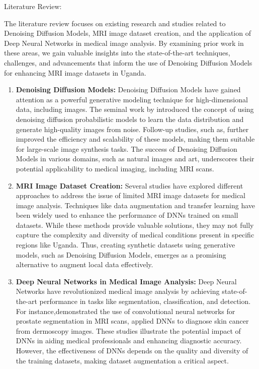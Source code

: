Literature Review:

The literature review focuses on existing research and studies related to Denoising Diffusion Models, MRI image dataset creation, and the application of Deep Neural Networks in medical image analysis. By examining prior work in these areas, we gain valuable insights into the state-of-the-art techniques, challenges, and advancements that inform the use of Denoising Diffusion Models for enhancing MRI image datasets in Uganda.

\begin{enumerate}

    \item {\bf Denoising Diffusion Models:}
    Denoising Diffusion Models have gained attention as a powerful generative modeling technique for high-dimensional data, including images. The seminal work by\cite{ho2020denoising} introduced the concept of using denoising diffusion probabilistic models to learn the data distribution and generate high-quality images from noise. Follow-up studies, such as\cite{dhariwal2021diffusion}, further improved the efficiency and scalability of these models, making them suitable for large-scale image synthesis tasks. The success of Denoising Diffusion Models in various domains, such as natural images and art, underscores their potential applicability to medical imaging, including MRI scans.

    \item {\bf MRI Image Dataset Creation:}
    Several studies have explored different approaches to address the issue of limited MRI image datasets for medical image analysis. Techniques like data augmentation and transfer learning\cite{sanford2020data} have been widely used to enhance the performance of DNNs trained on small datasets. While these methods provide valuable solutions, they may not fully capture the complexity and diversity of medical conditions present in specific regions like Uganda. Thus, creating synthetic datasets using generative models, such as Denoising Diffusion Models, emerges as a promising alternative to augment local data effectively.

    \item {\bf Deep Neural Networks in Medical Image Analysis:}
    Deep Neural Networks have revolutionized medical image analysis by achieving state-of-the-art performance in tasks like segmentation, classification, and detection. For instance,\cite{bejnordi2017context}demonstrated the use of convolutional neural networks for prostate segmentation in MRI scans,\cite{ali2021enhanced} applied DNNs to diagnose skin cancer from dermoscopy images. These studies illustrate the potential impact of DNNs in aiding medical professionals and enhancing diagnostic accuracy. However, the effectiveness of DNNs depends on the quality and diversity of the training datasets, making dataset augmentation a critical aspect.


\end{enumerate}
